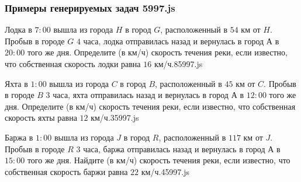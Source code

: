 
\subsubsection*{Примеры генерируемых задач 5997.js}   

\par{Лодка в $7:00$ вышла из города $H$ в город $G$, расположенный в $54$ км от $H$. Пробыв в городе $G$ $4$ часа, лодка отправилась назад и вернулась в город $А$ в $20:00$ того же дня. Определите (в км/ч) скорость течения реки, если известно, что собственная скорость лодки равна $16$ км/ч.}{8}{5997.js}
\par{Яхта в $1:00$ вышла из города $C$ в город $B$, расположенный в $45$ км от $C$. Пробыв в городе $B$ $3$ часа, яхта отправилась назад и вернулась в город $А$ в $12:00$ того же дня. Определите (в км/ч) скорость течения реки, если известно, что собственная скорость яхты равна $12$ км/ч.}{3}{5997.js}
\par{Баржа в $1:00$ вышла из города $J$ в город $R$, расположенный в $117$ км от $J$. Пробыв в городе $R$ $3$ часа, баржа отправилась назад и вернулась в город $А$ в $15:00$ того же дня. Найдите (в км/ч) скорость течения реки, если известно, что собственная скорость баржи равна $22$ км/ч.}{4}{5997.js}	
